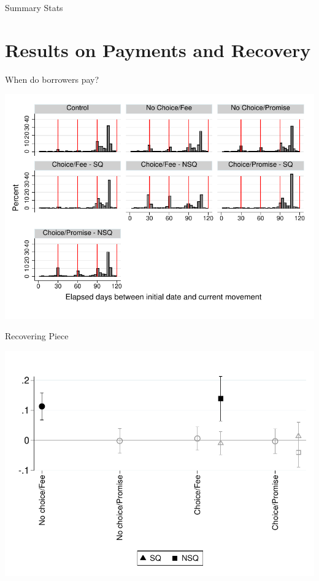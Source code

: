 \documentclass[9pt]{beamer}
\begin{document}
\begin{frame}{Summary Stats}
    \begin{table}
        \begin{center}
        \tiny{}
        \end{center}
    \end{table}
\end{frame}




\section{Results on Payments and Recovery}

\begin{frame}{When do borrowers pay?}
    \begin{center}
        \includegraphics[width=\textwidth]{Figuras/hist_payments.pdf}
    \end{center}
\end{frame}


\begin{frame}{Recovering Piece}

    \begin{center}
        \includegraphics[width=.70\textwidth]{Figuras/te_graph_des_c.pdf}
    \end{center}
\end{frame}
\end{document}
